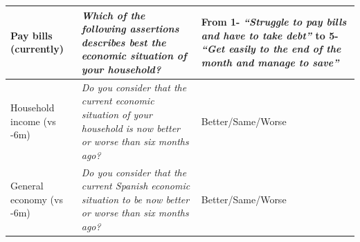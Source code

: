 \documentclass[12pt]{article}
\begin{document}
\begin{table}[]
\begin{tabular}{  | p{5cm} | p{5cm} | p{5cm} |}
\multicolumn{1}{|p{4cm}|}{Pay bills (currently)}       & \multicolumn{1}{p{8cm}|}{\emph{Which of the following assertions describes best the economic situation of your household?}}  & \multicolumn{1}{p{3.5cm}|}{From 1- \emph{``Struggle to pay bills and have to take debt''} to 5- \emph{``Get easily to the end of the month and manage to save''} }           \\ \hline
\multicolumn{1}{|p{4cm}|}{Household income (vs -6m)}       & \multicolumn{1}{p{8cm}|}{\emph{Do you consider that the current economic situation of your household is now better or worse than six months ago?}}  & \multicolumn{1}{p{3cm}|}{Better/Same/Worse}           \\ \hline
\multicolumn{1}{|p{4cm}|}{General economy  (vs -6m)}       & \multicolumn{1}{p{8cm}|}{\emph{Do you consider that the current Spanish economic situation to be now better or worse than six months ago?}}  & \multicolumn{1}{p{3cm}|}{Better/Same/Worse}           \\ \hline




\end{tabular}
\end{table}
\end{document}
